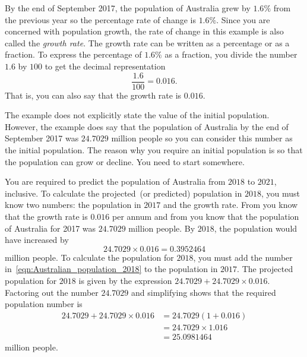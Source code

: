\documentclass[a4paper,oneside,12pt]{article}
\begin{document}
\begin{solution}
By the end of September 2017, the population of Australia grew by
$1.6\%$ from the previous year so the percentage rate of change is
$1.6\%$.  Since you are concerned with population growth, the rate of
change in this example is also called the \emph{growth rate}.  The
growth rate can be written as a percentage or as a fraction.  To
express the percentage of $1.6\%$ as a fraction, you divide the number
$1.6$ by $100$ to get the decimal representation
\[
\frac{1.6}{100}
=
0.016.
\]
That is, you can also say that the growth rate is $0.016$.

The example does not explicitly state the value of the initial
population.  However, the example does say that the population of
Australia by the end of September 2017 was $24.7029$ million people so
you can consider this number as the initial population.  The reason
why you require an initial population is so that the population can
grow or decline.  You need to start somewhere.

You are required to predict the population of Australia from $2018$ to
$2021$, inclusive.  To calculate the projected~(or predicted)
population in $2018$, you must know two numbers: the population in
$2017$ and the growth rate.
From  you know that
the growth rate is $0.016$ per annum and
from  you
know that the population of Australia for 2017 was $24.7029$ million
people.  By $2018$, the population would have increased by
\begin{equation}
\label{eqn:Australian_population_2018}
24.7029 \times 0.016
=
0.3952464
\end{equation}
million people.  To calculate the population for $2018$, you must add
the number in~\eqref{eqn:Australian_population_2018} to the population
in $2017$.  The projected population for $2018$ is given by the
expression $24.7029 + 24.7029 \times 0.016$.  Factoring out the number
$24.7029$ and simplifying shows that the required population number is
\begin{equation}
\label{eqn:Australian_population_2018_calculation}
\begin{aligned}
24.7029 + 24.7029 \times 0.016
&=
24.7029 (1 + 0.016) \\[4pt]
&=
24.7029 \times 1.016 \\[4pt]
&=
25.0981464
\end{aligned}
\end{equation}
million people.


\end{solution}
\end{document}
